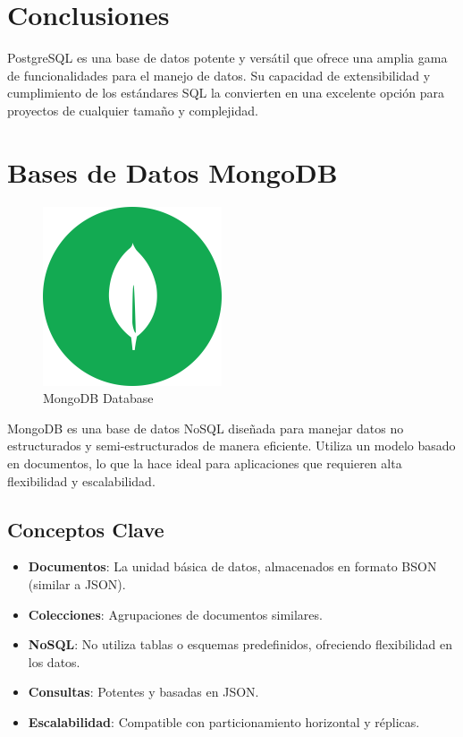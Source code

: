 \documentclass[
  a4paper,
  DIV=11,
  numbers=noendperiod,
  onepage,
  openany]{scrreprt}
\providecommand{\tightlist}{%
  \setlength{\itemsep}{0pt}\setlength{\parskip}{0pt}}\usepackage{longtable,booktabs,array}
\begin{document}
\chapter{Conclusiones}\label{conclusiones-10}

PostgreSQL es una base de datos potente y versátil que ofrece una amplia
gama de funcionalidades para el manejo de datos. Su capacidad de
extensibilidad y cumplimiento de los estándares SQL la convierten en una
excelente opción para proyectos de cualquier tamaño y complejidad.

\chapter{Bases de Datos MongoDB}\label{bases-de-datos-mongodb}

\begin{figure}[H]

{\centering \includegraphics[width=2.08333in,height=\textheight,keepaspectratio]{unidades/unidad6/./images/mongodb_logo.png}

}

\caption{MongoDB Database}

\end{figure}%

MongoDB es una base de datos NoSQL diseñada para manejar datos no
estructurados y semi-estructurados de manera eficiente. Utiliza un
modelo basado en documentos, lo que la hace ideal para aplicaciones que
requieren alta flexibilidad y escalabilidad.

\section{Conceptos Clave}\label{conceptos-clave-14}

\begin{itemize}
\tightlist
\item
  \textbf{Documentos}: La unidad básica de datos, almacenados en formato
  BSON (similar a JSON).
\item
  \textbf{Colecciones}: Agrupaciones de documentos similares.
\item
  \textbf{NoSQL}: No utiliza tablas o esquemas predefinidos, ofreciendo
  flexibilidad en los datos.
\item
  \textbf{Consultas}: Potentes y basadas en JSON.
\item
  \textbf{Escalabilidad}: Compatible con particionamiento horizontal y
  réplicas.
\end{itemize}
\end{document}
